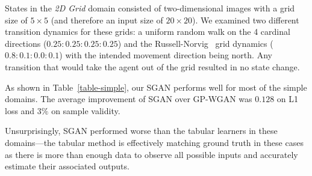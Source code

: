 \documentclass[letterpaper]{article} %
\begin{document}
States in the \emph{2D Grid} domain consisted of two-dimensional images with a grid size of $5\times 5$ (and therefore an input size of $20\times 20$). We examined two different transition dynamics for these grids: a uniform random walk on the 4 cardinal directions ($0.25:0.25:0.25:0.25$) and the Russell-Norvig~\cite{russell94} grid dynamics ($0.8:0.1:0.0:0.1$) with the intended movement direction being north. Any transition that would take the agent out of the grid resulted in no state change.

As shown in Table~\ref{table-simple}, our SGAN performs well for most of the simple domains. The average improvement of SGAN over GP-WGAN was $0.128$ on L1 loss and $3\%$ on sample validity.

Unsurprisingly, SGAN performed worse than the tabular learners in these domains---the tabular method is effectively matching ground truth in these cases as there is more than enough data to observe all possible inputs and accurately estimate their associated outputs.
\end{document}
